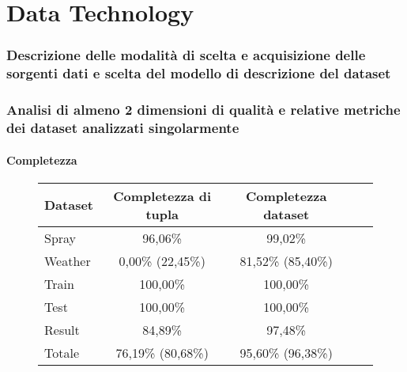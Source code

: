\part{Data Technology}
\section{Descrizione delle modalità di scelta e acquisizione delle sorgenti dati e scelta del modello di descrizione del dataset}

\section{Analisi di almeno 2 dimensioni di qualità e relative metriche dei dataset analizzati singolarmente}
\subsection{Completezza}

\begin{figure}[H]
	\centering
	\begin{tabular}{lcccc}
		\toprule
		\textbf{Dataset} \quad & \textbf{Completezza di tupla} & \textbf{Completezza dataset} \\
		\midrule
		Spray &			96,06\%  	& 99,02\%  \\ 
		Weather &		0,00\% (22,45\%)		& 81,52\% (85,40\%) \\ 
		Train &			100,00\% 	& 100,00\%   \\ 
		Test &			100,00\% 	& 100,00\%   \\ 
		Result &		84,89\%  	& 97,48\%  \\ 
		\midrule
		Totale &	    76,19\% (80,68\%) 	& 95,60\% (96,38\%) \\
		\bottomrule
	\end{tabular}
	\label{tab:completezza totale}
\end{figure}

